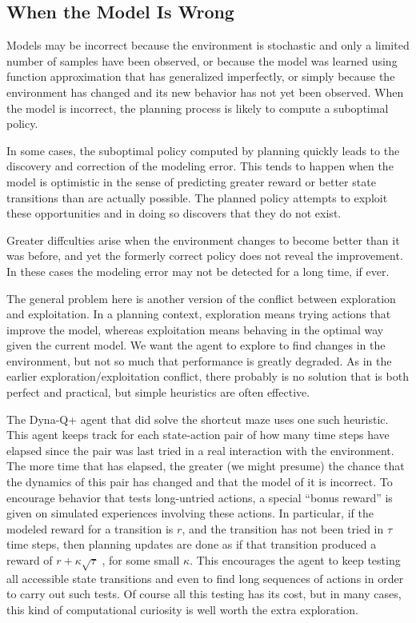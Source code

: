 \documentclass{article}
\begin{document}
\subsection{When the Model Is Wrong}

Models may be incorrect because the environment is stochastic and only a limited number of samples have been observed, or because the model was learned using 
function approximation that has generalized imperfectly, or simply because the environment has changed and its new behavior has not yet been observed. 
When the model is incorrect, the planning process is likely to compute a suboptimal policy.

In some cases, the suboptimal policy computed by planning quickly leads to the discovery and correction of the modeling error. This tends to happen when the model 
is optimistic in the sense of predicting greater reward or better state transitions than are actually possible. The planned policy attempts to exploit these opportunities 
and in doing so discovers that they do not exist.

Greater diffculties arise when the environment changes to become better than it was 
before, and yet the formerly correct policy does not reveal the improvement. In these 
cases the modeling error may not be detected for a long time, if ever.

The general problem here is another version of the conflict between exploration and 
exploitation. In a planning context, exploration means trying actions that improve the 
model, whereas exploitation means behaving in the optimal way given the current model. 
We want the agent to explore to find changes in the environment, but not so much that 
performance is greatly degraded. As in the earlier exploration/exploitation conflict, there 
probably is no solution that is both perfect and practical, but simple heuristics are often 
effective.

The Dyna-Q+ agent that did solve the shortcut maze uses one such heuristic. This 
agent keeps track for each state-action pair of how many time steps have elapsed since 
the pair was last tried in a real interaction with the environment. The more time that 
has elapsed, the greater (we might presume) the chance that the dynamics of this pair 
has changed and that the model of it is incorrect. To encourage behavior that tests 
long-untried actions, a special “bonus reward” is given on simulated experiences involving 
these actions. In particular, if the modeled reward for a transition is $r$, and the transition 
has not been tried in $\tau$ time steps, then planning updates are done as if that transition 
produced a reward of $r + \kappa { \sqrt { \tau } }$ , for some small $\kappa$. This encourages the agent to keep 
testing all accessible state transitions and even to find long sequences of actions in order 
to carry out such tests. Of course all this testing has its cost, but in many cases, 
this kind of computational curiosity is well worth the extra exploration.
\end{document}
